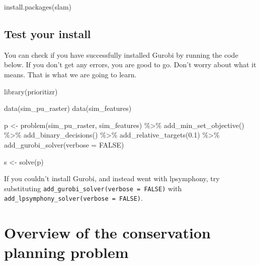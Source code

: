 \documentclass[
  12pt,
]{book}
\newenvironment{Shaded}{\begin{snugshade}}{\end{snugshade}}
\newcommand{\AttributeTok}[1]{\textcolor[rgb]{0.77,0.63,0.00}{#1}}
\newcommand{\ConstantTok}[1]{\textcolor[rgb]{0.00,0.00,0.00}{#1}}
\newcommand{\FloatTok}[1]{\textcolor[rgb]{0.00,0.00,0.81}{#1}}
\newcommand{\FunctionTok}[1]{\textcolor[rgb]{0.00,0.00,0.00}{#1}}
\newcommand{\NormalTok}[1]{#1}
\newcommand{\OtherTok}[1]{\textcolor[rgb]{0.56,0.35,0.01}{#1}}
\newcommand{\SpecialCharTok}[1]{\textcolor[rgb]{0.00,0.00,0.00}{#1}}
\newcommand{\StringTok}[1]{\textcolor[rgb]{0.31,0.60,0.02}{#1}}
\begin{document}
\begin{Shaded}
\begin{Highlighting}[]
\FunctionTok{install.packages}\NormalTok{(}\StringTok{\textquotesingle{}slam\textquotesingle{}}\NormalTok{)}
\end{Highlighting}
\end{Shaded}

\hypertarget{test-your-install}{%
\section{Test your install}\label{test-your-install}}

You can check if you have successfully installed Gurobi by running the code below. If you don't get any errors, you are good to go. Don't worry about what it means. That is what we are going to learn.

\begin{Shaded}
\begin{Highlighting}[]
\FunctionTok{library}\NormalTok{(prioritizr)}

\FunctionTok{data}\NormalTok{(sim\_pu\_raster)}
\FunctionTok{data}\NormalTok{(sim\_features)}

\NormalTok{p }\OtherTok{\textless{}{-}} \FunctionTok{problem}\NormalTok{(sim\_pu\_raster, sim\_features) }\SpecialCharTok{\%\textgreater{}\%}
  \FunctionTok{add\_min\_set\_objective}\NormalTok{() }\SpecialCharTok{\%\textgreater{}\%}
  \FunctionTok{add\_binary\_decisions}\NormalTok{() }\SpecialCharTok{\%\textgreater{}\%}
  \FunctionTok{add\_relative\_targets}\NormalTok{(}\FloatTok{0.1}\NormalTok{) }\SpecialCharTok{\%\textgreater{}\%}
  \FunctionTok{add\_gurobi\_solver}\NormalTok{(}\AttributeTok{verbose =} \ConstantTok{FALSE}\NormalTok{)}

\NormalTok{s }\OtherTok{\textless{}{-}} \FunctionTok{solve}\NormalTok{(p)}
\end{Highlighting}
\end{Shaded}

If you couldn't install Gurobi, and instead went with lpsymphony, try substituting \texttt{add\_gurobi\_solver(verbose\ =\ FALSE)} with \texttt{add\_lpsymphony\_solver(verbose\ =\ FALSE)}.

\hypertarget{overview-of-the-conservation-planning-problem}{%
\chapter{Overview of the conservation planning problem}\label{overview-of-the-conservation-planning-problem}}
\end{document}
